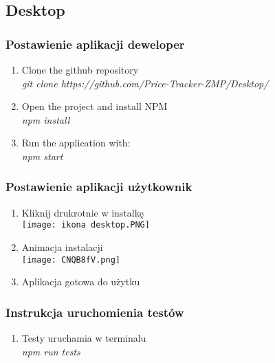 \documentclass{article}
\begin{document}
    \subsection{Desktop}
        \subsubsection{Postawienie aplikacji deweloper}
        \begin{enumerate}
            \item Clone the github repository\\
                        \emph{git clone https://github.com/Price-Tracker-ZMP/Desktop/} \\
            \item Open the project and install NPM\\
              \emph{npm install} \\
            \item Run the application with:\\
                \emph{npm start} \\
        \end{enumerate}
   
        \subsubsection{Postawienie aplikacji użytkownik}
        \begin{enumerate}
            \item Kliknij drukrotnie w instalkę\\
                \texttt{[image: ikona desktop.PNG]}\\
            \item Animacja instalacji\\
                \texttt{[image: CNQB8fV.png]}\\
            \item Aplikacja gotowa do użytku\\
        \end{enumerate}
        
        \subsubsection{Instrukcja uruchomienia testów}
        \begin{enumerate}
            \item Testy uruchamia w terminalu\\
            \emph{npm run tests} \\
        \end{enumerate}
        
\end{document}
